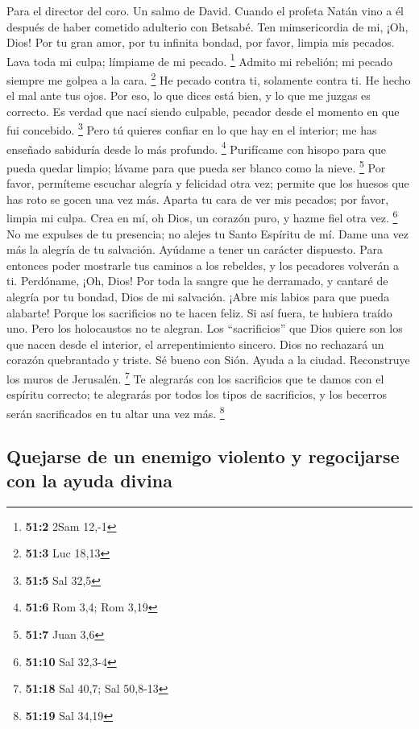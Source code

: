 Para el director del coro. Un salmo de David. Cuando el profeta Natán
vino a él después de haber cometido adulterio con Betsabé. 
Ten mimsericordia de mi, ¡Oh, Dios! Por tu gran amor, por tu infinita
bondad, por favor, limpia mis pecados.  Lava toda mi culpa;
límpiame de mi pecado. \footnote{\textbf{51:2} 2Sam 12,-1} 
Admito mi rebelión; mi pecado siempre me golpea a la cara. \footnote{\textbf{51:3}
  Luc 18,13}  He pecado contra ti, solamente contra ti. He
hecho el mal ante tus ojos. Por eso, lo que dices está bien, y lo que me
juzgas es correcto.  Es verdad que nací siendo culpable,
pecador desde el momento en que fui concebido. \footnote{\textbf{51:5}
  Sal 32,5}  Pero tú quieres confiar en lo que hay en el
interior; me has enseñado sabiduría desde lo más profundo. \footnote{\textbf{51:6}
  Rom 3,4; Rom 3,19}  Purifícame con hisopo para que pueda
quedar limpio; lávame para que pueda ser blanco como la nieve.
\footnote{\textbf{51:7} Juan 3,6}  Por favor, permíteme
escuchar alegría y felicidad otra vez; permite que los huesos que has
roto se gocen una vez más.  Aparta tu cara de ver mis
pecados; por favor, limpia mi culpa.  Crea en mí, oh Dios,
un corazón puro, y hazme fiel otra vez. \footnote{\textbf{51:10} Sal
  32,3-4}  No me expulses de tu presencia; no alejes tu
Santo Espíritu de mí.  Dame una vez más la alegría de tu
salvación. Ayúdame a tener un carácter dispuesto.  Para
entonces poder mostrarle tus caminos a los rebeldes, y los pecadores
volverán a ti.  Perdóname, ¡Oh, Dios! Por toda la sangre
que he derramado, y cantaré de alegría por tu bondad, Dios de mi
salvación.  ¡Abre mis labios para que pueda alabarte!
 Porque los sacrificios no te hacen feliz. Si así fuera, te
hubiera traído uno. Pero los holocaustos no te alegran. 
Los ``sacrificios'' que Dios quiere son los que nacen desde el interior,
el arrepentimiento sincero. Dios no rechazará un corazón quebrantado y
triste.  Sé bueno con Sión. Ayuda a la ciudad. Reconstruye
los muros de Jerusalén. \footnote{\textbf{51:18} Sal 40,7; Sal 50,8-13}
 Te alegrarás con los sacrificios que te damos con el
espíritu correcto; te alegrarás por todos los tipos de sacrificios, y
los becerros serán sacrificados en tu altar una vez más. \footnote{\textbf{51:19}
  Sal 34,19}

\hypertarget{quejarse-de-un-enemigo-violento-y-regocijarse-con-la-ayuda-divina}{%
\subsection{Quejarse de un enemigo violento y regocijarse con la ayuda
divina}\label{quejarse-de-un-enemigo-violento-y-regocijarse-con-la-ayuda-divina}}

